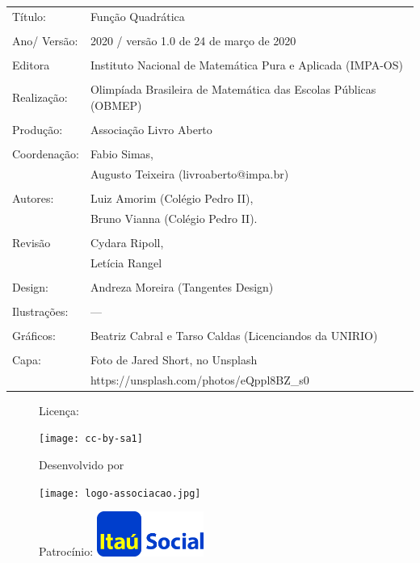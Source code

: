 \begin{tabular}{p{}p{}}
Título: & Função Quadrática\\
\\
Ano/ Versão: & 2020 / versão 1.0 de 24 de março de 2020\\
\\
Editora & Instituto Nacional de Matem\'atica Pura e Aplicada (IMPA-OS)\\
\\
Realização:& Olimp\'iada Brasileira de Matem\'atica das Escolas P\'ublicas (OBMEP)\\
\\
Produção:& Associação Livro Aberto\\
\\
Coordenação:& Fabio Simas, \\
			& Augusto Teixeira (livroaberto@impa.br)\\
\\
  Autores: & Luiz Amorim (Colégio Pedro II),\\
           & Bruno Vianna (Colégio Pedro II).\\

\\
Revisão &  Cydara Ripoll,  \\
        &  Letícia Rangel \\
\\
Design: & Andreza Moreira (Tangentes Design) \\
\\
  Ilustrações: & --- \\ 
\\
Gráficos: & Beatriz Cabral e Tarso Caldas (Licenciandos da UNIRIO)\\
\\
  Capa: & Foto de Jared Short, no Unsplash\\
  		& https://unsplash.com/photos/eQppl8BZ\_s0 \\

\end{tabular}
\vspace{.5cm}


\begin{figure}[b]
\begin{minipage}[l]{5cm}
\centering

{\large Licença:}

  \texttt{[image: cc-by-sa1]}
\end{minipage}\hfill
\begin{minipage}[c]{5cm}
\centering
{\large Desenvolvido por}

\texttt{[image: logo-associacao.jpg]}
\end{minipage}
\begin{minipage}[r]{5cm}
\centering

{\large Patrocínio:}
  \vspace{1em}
  \includegraphics[width=3.5cm]{itau}
\end{minipage}
\end{figure}

